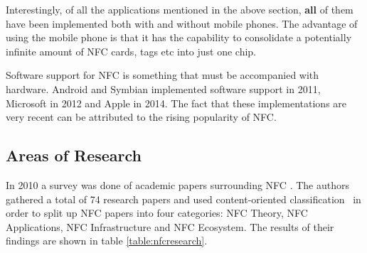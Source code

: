 Interestingly, of all the applications mentioned in the above section, \textbf{all} of them have been implemented both with and without mobile phones. The advantage of using the mobile phone is that it has the capability to consolidate a potentially infinite amount of NFC cards, tags etc into just one chip.

Software support for NFC is something that must be accompanied with hardware. Android and Symbian implemented software support in 2011, Microsoft in 2012 and Apple in 2014. The fact that these implementations are very recent can be attributed to the rising popularity of NFC. 

\subsection{Areas of Research}
In 2010 a survey was done of academic papers surrounding NFC \cite{nfctable}. The authors gathered a total of 74 research papers and used content-oriented classification~\cite{ngai2008rfid} in order to split up NFC papers into four categories: NFC Theory, NFC Applications, NFC Infrastructure and NFC Ecosystem. The results of their findings are shown in table \ref{table:nfcresearch}.
